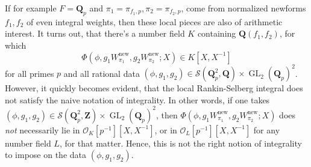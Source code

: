 \documentclass{amsart}
\theoremstyle{plain}
\theoremstyle{plain}
\theoremstyle{remark}
\DeclareMathOperator{\GL}{GL}
\begin{document}
If for example $F=\mathbf{Q}_p$ and $\pi_1=\pi_{f_1,p},\pi_2=\pi_{f_2,p}$, come from normalized newforms $f_1,f_2$ of even integral weights, then these local pieces are also of arithmetic interest. It turns out, that there's a number field $K$ containing $\mathbf{Q}(f_1,f_2)$, for which 
$$\Phi(\phi, g_1W_{\pi_1}^\mathrm{new}, g_2W_{\pi_2}^\mathrm{new};X)\in   K[X,X^{-1}]$$
for all primes $p$ and all rational data $(\phi,g_1,g_2)\in\mathcal{S}(\mathbf{Q}_p^2,\mathbf{Q})\times\GL_2(\mathbf{Q}_p)^2$. However, it quickly becomes evident, that the local Rankin-Selberg integral does not satisfy the naive notation of integrality. In other words, if one takes $(\phi,g_1,g_2)\in\mathcal{S}(\mathbf{Q}_p^2,\mathbf{Z})\times \GL_2(\mathbf{Q}_p)^2$, then $\Phi(\phi,g_1W_{\pi_1}^\mathrm{new}, g_2W_{\pi_2}^\mathrm{new};X)$ does \textit{not} necessarily lie in $\mathcal{O}_K[p^{-1}][X,X^{-1}]$, or in $\mathcal{O}_L[p^{-1}][X,X^{-1}]$ for any number field $L$, for that matter. Hence, this is not the right notion of integrality to impose on the data $(\phi,g_1,g_2)$.
\end{document}
